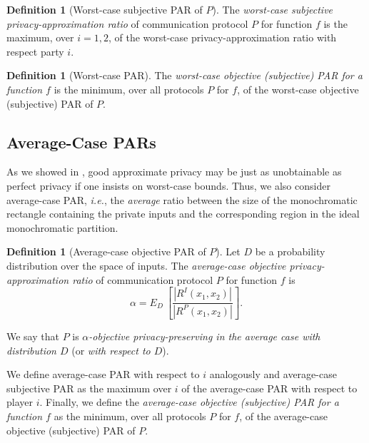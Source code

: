 \documentclass{article}
\theoremstyle{theorem}
\theoremstyle{definition}
\newtheorem{definition}[theorem]{Definition}
\theoremstyle{remark}
\begin{document}
\begin{definition}[Worst-case subjective PAR of $P$]
The \emph{worst-case subjective privacy-ap\-prox\-i\-ma\-tion ratio} of
communication protocol $P$ for function $f$ is the maximum, over $i=1,2$, of the
worst-case privacy-approximation ratio with respect party $i$.
\end{definition}

\begin{definition}[Worst-case PAR]
The \emph{worst-case objective (subjective) PAR for a function $f$}
is the minimum, over all protocols $P$ for $f$, of the worst-case objective (subjective) PAR of $P$.
\end{definition}

\subsection{Average-Case PARs}\label{ssec:par-ac}

As we showed in \cite{fjs09tr14}, good approximate privacy may be
just as unobtainable as perfect privacy if one insists on worst-case
bounds. Thus, we also consider average-case PAR, {\it i.e.},
the \emph{average} ratio between the size of the monochromatic
rectangle containing the private inputs and the corresponding region
in the ideal monochromatic partition.

\begin{definition}[Average-case objective PAR of $P$]\label{def:par-avg}
Let $D$ be a probability distribution over the space of inputs. The
\emph{average-case objective privacy-approximation ratio} of
communication protocol $P$ for function $f$ is
\[
    \alpha = E_{D}\ [\frac{|R^I(x_1,x_2)|}{|R^P(x_1,x_2)|}].
\]

We say that $P$ is \emph{$\alpha$-objective privacy-preserving in
the average case with distribution $D$} (or \emph{with respect to
$D$}).
\end{definition}

We define average-case PAR with respect to $i$ analogously and average-case
subjective PAR as the maximum over $i$ of the average-case PAR with respect to player $i$.
Finally, we define the \emph{average-case objective (subjective) PAR for a function
$f$} as the minimum, over all protocols $P$ for $f$, of the average-case objective
(subjective) PAR of $P$.
\end{document}
